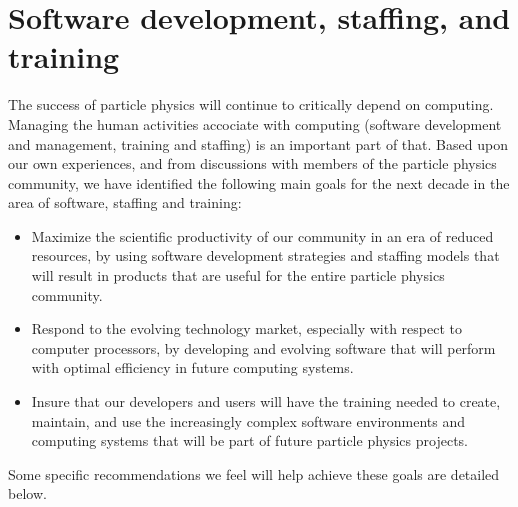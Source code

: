 \section{Software development, staffing, and training}

The success of particle physics will continue to critically depend on computing.
Managing the human activities accociate with computing
(software development and management,
training and staffing) is an important part of that.  
Based upon our own experiences, and from
discussions with members of the particle physics community,
we have identified the following main goals for the next decade in the area
of software, staffing and training:

\begin{itemize}
\item Maximize the scientific productivity of our community
in an era of reduced resources, by using
software development strategies and staffing models that will result in products
that are useful for the entire particle physics community.
\item Respond to the evolving technology market, especially
with respect to computer processors, by
developing and evolving software that will perform with optimal efficiency
in future computing systems.
\item Insure that our developers and users will have the
training needed to create, maintain, and use the increasingly complex software
environments and computing systems that will be part of future 
particle physics projects.
\end{itemize}

Some specific recommendations we feel will help achieve these goals are detailed
below.

